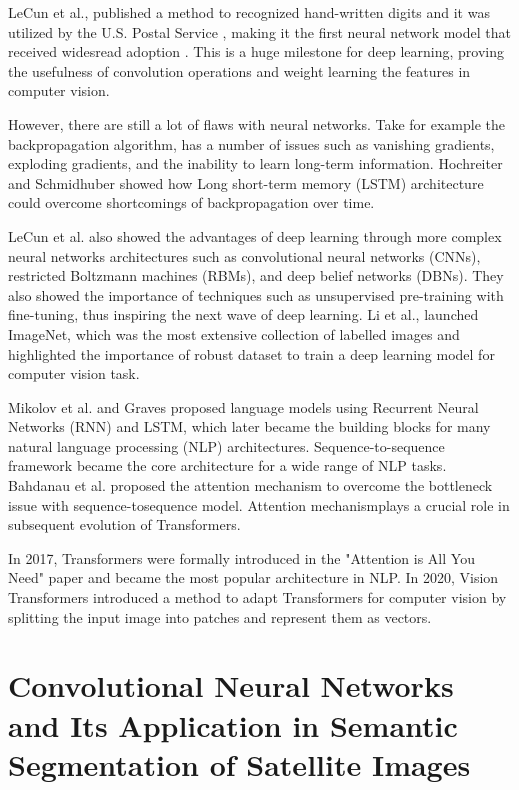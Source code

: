 LeCun et al., published a method to recognized hand-written digits and it was utilized by the U.S. Postal Service \cite{LeCunBoserDenkerEtAl89}, making it the first neural network model that received widesread adoption . This is a huge milestone for deep learning, proving the usefulness of convolution operations and weight learning the features in computer vision.

However, there are still a lot of flaws with neural networks. Take for example the backpropagation algorithm, has a number of issues such as vanishing gradients, exploding gradients, and the inability to learn long-term information. Hochreiter and Schmidhuber showed how  Long short-term memory (LSTM) architecture could overcome shortcomings of backpropagation over time.

LeCun et al. also showed the advantages of deep learning through more complex neural networks architectures such as convolutional neural networks (CNNs), restricted Boltzmann machines (RBMs), and deep belief networks (DBNs). They also showed the importance of techniques such as unsupervised pre-training
with fine-tuning, thus inspiring the next wave of deep learning. Li et al.,  launched ImageNet, which was the most extensive collection of labelled images and highlighted the importance of robust dataset to train a deep learning model for computer vision task. 

Mikolov et al. and Graves proposed language models using Recurrent Neural Networks (RNN) and LSTM, which later became the building blocks for many natural language processing (NLP) architectures. Sequence-to-sequence framework became the core architecture for a wide range of NLP tasks. Bahdanau et al. proposed the attention mechanism to overcome the bottleneck issue with sequence-tosequence model. Attention mechanismplays a crucial role in subsequent evolution of Transformers.

In 2017, Transformers were formally introduced in the "Attention is All You Need" paper \cite{attention-is-all-you-need} and became the most popular architecture in NLP. In 2020, Vision Transformers \cite{16x16} introduced a method to adapt Transformers for computer vision by splitting the input image into patches and represent them as vectors.

\section{Convolutional Neural Networks and Its Application in Semantic Segmentation of Satellite Images}

